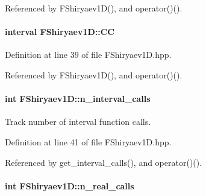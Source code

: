 \-Referenced by \-F\-Shiryaev1\-D(), and operator()().

\hypertarget{classFShiryaev1D_a4da3224ab754db6253a91b2f50c48bd7}{
\paragraph[{\-C\-C}]{\setlength{\rightskip}{0pt plus 5cm}interval {\bf \-F\-Shiryaev1\-D\-::\-C\-C}}}\label{classFShiryaev1D_a4da3224ab754db6253a91b2f50c48bd7}


\-Definition at line 39 of file \-F\-Shiryaev1\-D.\-hpp.



\-Referenced by \-F\-Shiryaev1\-D(), and operator()().

\hypertarget{classFShiryaev1D_a883a026ce025e27ad577d7119aec3d5b}{
\paragraph[{n\-\_\-interval\-\_\-calls}]{\setlength{\rightskip}{0pt plus 5cm}int {\bf \-F\-Shiryaev1\-D\-::n\-\_\-interval\-\_\-calls}}}\label{classFShiryaev1D_a883a026ce025e27ad577d7119aec3d5b}


\-Track number of interval function calls. 



\-Definition at line 41 of file \-F\-Shiryaev1\-D.\-hpp.



\-Referenced by get\-\_\-interval\-\_\-calls(), and operator()().

\hypertarget{classFShiryaev1D_a509bc24aebc78394aeb8181620fa6c72}{
\paragraph[{n\-\_\-real\-\_\-calls}]{\setlength{\rightskip}{0pt plus 5cm}int {\bf \-F\-Shiryaev1\-D\-::n\-\_\-real\-\_\-calls}}}\label{classFShiryaev1D_a509bc24aebc78394aeb8181620fa6c72}


